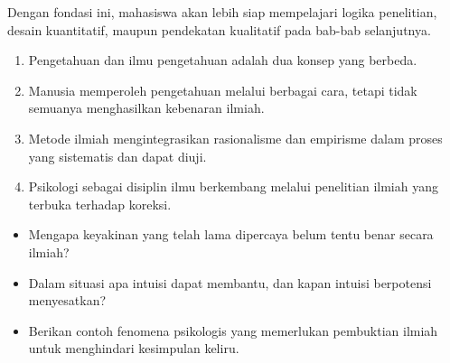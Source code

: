 \documentclass[
  indonesian,
  letterpaper,
  DIV=11,
  numbers=noendperiod]{scrreprt}
\providecommand{\tightlist}{%
  \setlength{\itemsep}{0pt}\setlength{\parskip}{0pt}}
\begin{document}
Dengan fondasi ini, mahasiswa akan lebih siap mempelajari logika
penelitian, desain kuantitatif, maupun pendekatan kualitatif pada
bab-bab selanjutnya.

\begin{tcolorbox}[enhanced jigsaw, colframe=quarto-callout-tip-color-frame, toptitle=1mm, breakable, leftrule=.75mm, arc=.35mm, toprule=.15mm, colback=white, colbacktitle=quarto-callout-tip-color!10!white, bottomtitle=1mm, bottomrule=.15mm, titlerule=0mm, title=\textcolor{quarto-callout-tip-color}{\faLightbulb}\hspace{0.5em}{Rangkuman}, coltitle=black, left=2mm, opacitybacktitle=0.6, opacityback=0, rightrule=.15mm]

\begin{enumerate}
\def\labelenumi{\arabic{enumi}.}
\tightlist
\item
  Pengetahuan dan ilmu pengetahuan adalah dua konsep yang berbeda.
\item
  Manusia memperoleh pengetahuan melalui berbagai cara, tetapi tidak
  semuanya menghasilkan kebenaran ilmiah.
\item
  Metode ilmiah mengintegrasikan rasionalisme dan empirisme dalam proses
  yang sistematis dan dapat diuji.
\item
  Psikologi sebagai disiplin ilmu berkembang melalui penelitian ilmiah
  yang terbuka terhadap koreksi.
\end{enumerate}

\end{tcolorbox}

\begin{tcolorbox}[enhanced jigsaw, colframe=quarto-callout-important-color-frame, toptitle=1mm, breakable, leftrule=.75mm, arc=.35mm, toprule=.15mm, colback=white, colbacktitle=quarto-callout-important-color!10!white, bottomtitle=1mm, bottomrule=.15mm, titlerule=0mm, title=\textcolor{quarto-callout-important-color}{\faExclamation}\hspace{0.5em}{Refleksi \& Diskusi}, coltitle=black, left=2mm, opacitybacktitle=0.6, opacityback=0, rightrule=.15mm]

\begin{itemize}
\tightlist
\item
  Mengapa keyakinan yang telah lama dipercaya belum tentu benar secara
  ilmiah?
\item
  Dalam situasi apa intuisi dapat membantu, dan kapan intuisi berpotensi
  menyesatkan?
\item
  Berikan contoh fenomena psikologis yang memerlukan pembuktian ilmiah
  untuk menghindari kesimpulan keliru.
\end{itemize}

\end{tcolorbox}
\end{document}
